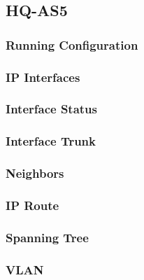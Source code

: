 \subsection{HQ-AS5}
\subsubsection{Running Configuration}


\subsubsection{IP Interfaces}


\subsubsection{Interface Status}


\subsubsection{Interface Trunk}


\subsubsection{Neighbors}


\subsubsection{IP Route}


\subsubsection{Spanning Tree}


\subsubsection{VLAN}





